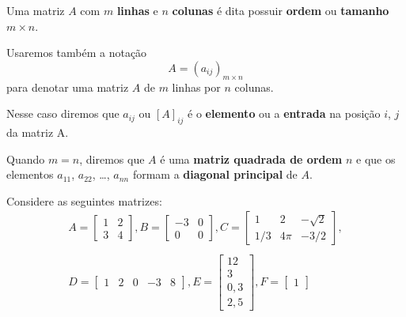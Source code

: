 \documentclass{beamer}
\begin{document}
    \begin{frame}

      Uma matriz $A$ com $m$ \textbf{linhas} e $n$ \textbf{colunas} é dita possuir \textbf{ordem} ou \textbf{tamanho} $m \times n$.

      Usaremos também a notação
      \[
        A = (a_{ij})_{m \times n}
      \]
      para denotar uma matriz $A$ de $m$ linhas por $n$ colunas.

      Nesse caso diremos que $a_{ij}$ ou $[A]_{ij}$ é o \textbf{elemento} ou a \textbf{entrada} na posição $i$, $j$ da matriz A.

      Quando $m = n$, diremos que $A$ é uma \textbf{matriz quadrada de ordem} $n$ e que os elementos $a_{11}$, $a_{22}$, \dots, $a_{nn}$ formam a \textbf{diagonal principal} de $A$.
    \end{frame}

    \begin{frame}
      \begin{exemplos}
        Considere as seguintes matrizes:
        \begin{align*}
          A = \begin{bmatrix}
            1 & 2\\
            3 & 4
          \end{bmatrix},
          B = \begin{bmatrix}
            -3 & 0\\
            0 & 0
          \end{bmatrix},
          C = \begin{bmatrix}
            1 & 2 & -\sqrt{2}\\
            1/3 & 4\pi & -3/2
          \end{bmatrix},\\\\
          D = \begin{bmatrix}
            1 & 2 & 0 & -3 & 8
          \end{bmatrix},
          E = \begin{bmatrix}
            12\\
            3\\
            0,3\\
            2,5
          \end{bmatrix},
          F = \begin{bmatrix}
            1
          \end{bmatrix}
        \end{align*}
      \end{exemplos}
    \end{frame}
\end{document}
